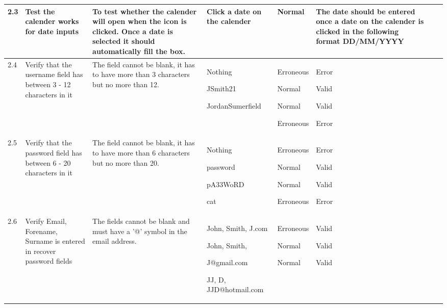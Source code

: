 \begin{landscape}
\begin{center}
\begin{longtable}{|p{1.5cm}|p{2cm}|p{2.5cm}|p{4cm}|p{2cm}|p{2cm}|p{1cm}|p{1.7cm}|}
2.3 & Test the calender works for date inputs & To test whether the calender will open when the icon is clicked. Once a date is selected it should automatically fill the box. & Click a date on the calender & Normal  & The date should be entered once a date on the calender is clicked in the following format DD/MM/YYYY && \\ \hline
2.4 & Verify that the username field has between 3 - 12 characters in it & The field cannot be blank, it has to have more than 3 characters but no more than 12. & Nothing \par \bigskip 30597 \par \bigskip JSmith21 \par \bigskip JordanSumerfield &Erroneous \par \bigskip  Normal \par \bigskip Normal \par \bigskip Erroneous & Error         \par \bigskip Valid              \par \bigskip Valid                 \par \bigskip Error && \\ \hline
2.5 & Verify that the password field has between 6 - 20 characters in it & The field cannot be blank, it has to have more than 6 characters but no more than 20. & Nothing \par password \par pA33WoRD \par cat  &Erroneous \par Normal \par Normal \par Erroneous & Error         \par Valid              \par Valid                 \par Error && \\ \hline
2.6 & Verify Email, Forename, Surname is entered in recover password fields & The fields cannot be blank and must have a '@' symbol in the email address. & John, Smith, J.com \par  \bigskip John, Smith, \par J@gmail.com \bigskip \par JJ, D, JJD@hotmail.com \par & Erroneous \par \bigskip Normal \par \bigskip \bigskip Normal &  \par Valid \par \bigskip Valid \par \bigskip \bigskip Valid&&\\ \hline

\end{longtable}
\end{center}
\end{landscape}
